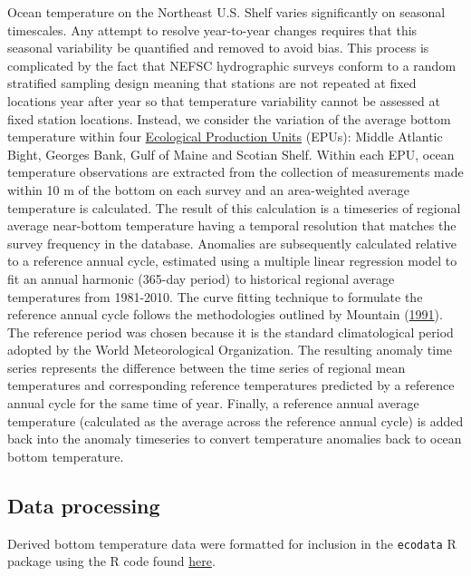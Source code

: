 \documentclass[
]{book}
\begin{document}
Ocean temperature on the Northeast U.S. Shelf varies significantly on seasonal timescales. Any attempt to resolve year-to-year changes requires that this seasonal variability be quantified and removed to avoid bias. This process is complicated by the fact that NEFSC hydrographic surveys conform to a random stratified sampling design meaning that stations are not repeated at fixed locations year after year so that temperature variability cannot be assessed at fixed station locations. Instead, we consider the variation of the average bottom temperature within four \protect\hyperlink{epu}{Ecological Production Units} (EPUs): Middle Atlantic Bight, Georges Bank, Gulf of Maine and Scotian Shelf. Within each EPU, ocean temperature observations are extracted from the collection of measurements made within 10 m of the bottom on each survey and an area-weighted average temperature is calculated. The result of this calculation is a timeseries of regional average near-bottom temperature having a temporal resolution that matches the survey frequency in the database. Anomalies are subsequently calculated relative to a reference annual cycle, estimated using a multiple linear regression model to fit an annual harmonic (365-day period) to historical regional average temperatures from 1981-2010. The curve fitting technique to formulate the reference annual cycle follows the methodologies outlined by Mountain (\protect\hyperlink{ref-mountain1991}{1991}). The reference period was chosen because it is the standard climatological period adopted by the World Meteorological Organization. The resulting anomaly time series represents the difference between the time series of regional mean temperatures and corresponding reference temperatures predicted by a reference annual cycle for the same time of year. Finally, a reference annual average temperature (calculated as the average across the reference annual cycle) is added back into the anomaly timeseries to convert temperature anomalies back to ocean bottom temperature.

\hypertarget{data-processing-2}{%
\subsection{Data processing}\label{data-processing-2}}

Derived bottom temperature data were formatted for inclusion in the \texttt{ecodata} R package using the R code found \href{https://github.com/NOAA-EDAB/ecodata/blob/master/data-raw/get_oceantemp_insitu.R}{here}.
\end{document}
